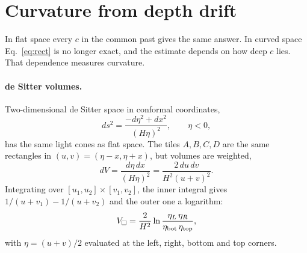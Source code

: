 \documentclass[11pt,a4paper]{article}
\begin{document}
\section{Curvature from depth drift}\label{sec:curv}
In flat space every $c$ in the common past gives the same answer. In curved space Eq.~\eqref{eq:rect} is no longer exact, and the estimate depends on how deep $c$ lies. That dependence measures curvature.

\paragraph{de Sitter volumes.} Two-dimensional de Sitter space in conformal coordinates,
\[ds^2=\frac{-d\eta^2+dx^2}{(H\eta)^2},\qquad\eta<0,\]
has the same light cones as flat space. The tiles $A,B,C,D$ are the same rectangles in $(u,v)=(\eta-x,\eta+x)$, but volumes are weighted,
\[dV=\frac{d\eta\,dx}{(H\eta)^2}=\frac{2\,du\,dv}{H^2(u+v)^2}.\]
Integrating over $[u_1,u_2]\times[v_1,v_2]$, the inner integral gives $1/(u+v_1)-1/(u+v_2)$ and the outer one a logarithm:
\begin{equation}
V_\square=\frac{2}{H^2}\ln\frac{\eta_L\,\eta_R}{\eta_{\rm bot}\,\eta_{\rm top}},
\label{eq:dsvol}
\end{equation}
with $\eta=(u+v)/2$ evaluated at the left, right, bottom and top corners.
\end{document}
